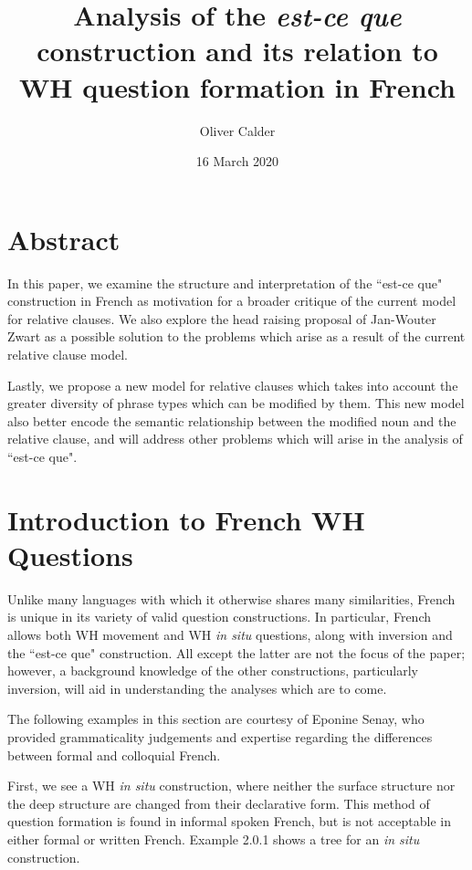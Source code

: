 \documentclass{article}
\title{Analysis of the \textit{est-ce que} construction and its relation to WH question formation in French}
\author{Oliver Calder}
\date{16 March 2020}
\begin{document}
\maketitle

\section{Abstract}

In this paper, we examine the structure and interpretation of the ``est-ce que" construction in French as motivation for a broader critique of the current model for relative clauses. We also explore the head raising proposal of Jan-Wouter Zwart as a possible solution to the problems which arise as a result of the current relative clause model. 

Lastly, we propose a new model for relative clauses which takes into account the greater diversity of phrase types which can be modified by them. This new model also better encode the semantic relationship between the modified noun and the relative clause, and will address other problems which will arise in the analysis of ``est-ce que".

\section{Introduction to French WH Questions}

Unlike many languages with which it otherwise shares many similarities, French is unique in its variety of valid question constructions. In particular, French allows both WH movement and WH \textit{in situ} questions, along with inversion and the ``est-ce que" construction. All except the latter are not the focus of the paper; however, a background knowledge of the other constructions, particularly inversion, will aid in understanding the analyses which are to come.

The following examples in this section are courtesy of Eponine Senay, who provided grammaticality judgements and expertise regarding the differences between formal and colloquial French.

First, we see a WH \textit{in situ} construction, where neither the surface structure nor the deep structure are changed from their declarative form. This method of question formation is found in informal spoken French, but is not acceptable in either formal or written French. Example 2.0.1 shows a tree for an \textit{in situ} construction.
\end{document}
